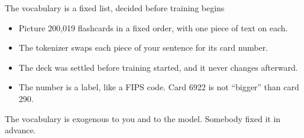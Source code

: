 \documentclass[aspectratio=169,11pt]{beamer}
\begin{document}
\begin{frame}{The vocabulary is a fixed list, decided before training begins}

\begin{center}
\end{center}

\vspace{0.3cm}

\begin{itemize}\setlength\itemsep{0.3em}
    \item Picture 200,019 flashcards in a fixed order, with one piece of text on each.
    \item The tokenizer swaps each piece of your sentence for its card number.
    \item The deck was settled before training started, and it never changes afterward.
    \item The number is a label, like a FIPS code. Card 6922 is not ``bigger'' than card 290.
\end{itemize}

\vspace{0.25cm}

\alert{The vocabulary is exogenous to you and to the model. Somebody fixed it in advance.}

\end{frame}
\end{document}
